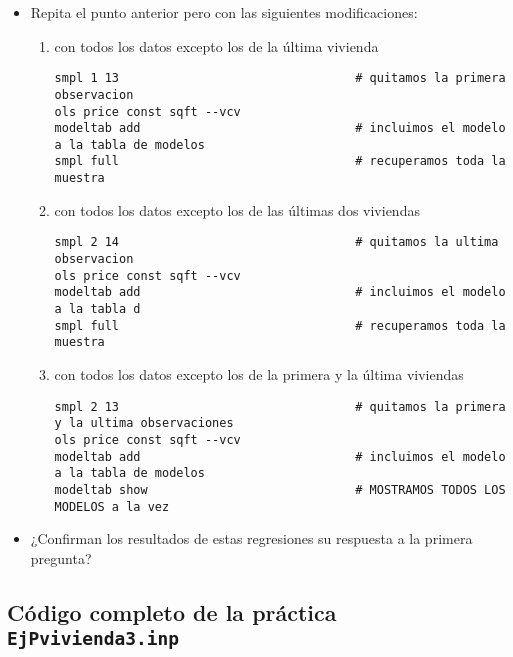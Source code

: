 \documentclass[11pt]{article}
\begin{document}
\begin{itemize}
\item Repita el punto anterior pero con las siguientes modificaciones:

\begin{enumerate}
\item con todos los datos excepto los de la última vivienda
\begin{verbatim}
smpl 1 13                                 # quitamos la primera observacion
ols price const sqft --vcv
modeltab add                              # incluimos el modelo a la tabla de modelos
smpl full                                 # recuperamos toda la muestra
\end{verbatim}

\item con todos los datos excepto los de las últimas dos viviendas
\begin{verbatim}
smpl 2 14                                 # quitamos la ultima observacion
ols price const sqft --vcv
modeltab add                              # incluimos el modelo a la tabla d
smpl full                                 # recuperamos toda la muestra
\end{verbatim}

\item con todos los datos excepto los de la primera y la última viviendas
\begin{verbatim}
smpl 2 13                                 # quitamos la primera y la ultima observaciones
ols price const sqft --vcv
modeltab add                              # incluimos el modelo a la tabla de modelos
modeltab show                             # MOSTRAMOS TODOS LOS MODELOS a la vez
\end{verbatim}
\end{enumerate}
\end{itemize}


\begin{itemize}
\item ¿Confirman los resultados de estas regresiones su respuesta a la
primera pregunta?
\end{itemize}

\clearpage
\vspace{10pt}
\noindent
\subsection{Código completo de la práctica \texttt{EjPvivienda3.inp}}
\label{sec:org8709962}
\vspace{10pt}

\clearpage
\end{document}
